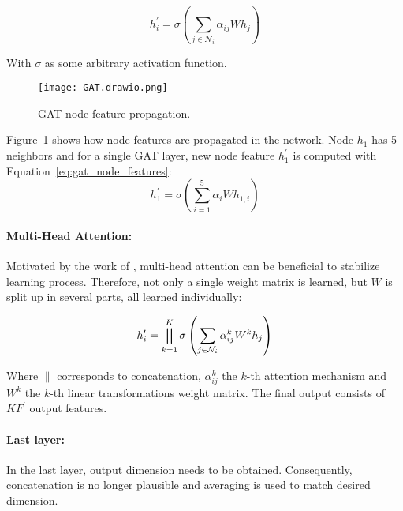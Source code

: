 \begin{equation}
  h_i^{\prime} = \sigma \left( \sum_{j \in \mathcal{N}_i} \alpha_{ij} W h_j \right)
  \label{eq:gat_node_features}
\end{equation}

With $\sigma$ as some arbitrary activation function.

\begin{minipage}{0.25\textwidth}
  \begin{figure}[H]
    \texttt{[image: GAT.drawio.png]}
    \caption{GAT node feature propagation.}
    \label{fig:gat_attention_illustration}
  \end{figure}
  \end{minipage} \hfill
  \begin{minipage}{0.7\textwidth}
    Figure~\ref{fig:gat_attention_illustration} shows how node features are propagated
    in the network.
    Node $h_1$ has 5 neighbors and for a single GAT layer, new node feature $h_1^{\prime}$
    is computed with Equation~\ref{eq:gat_node_features}: 
    $$h_{1}^{\prime} = \sigma \left( \sum_{i=1}^5\alpha_iWh_{1,i} \right)$$

  \end{minipage}


\paragraph{Multi-Head Attention:}
Motivated by the work of \citet{transformer}, multi-head attention can be beneficial to stabilize learning process.
Therefore, not only a single weight matrix is learned, but $W$ is split up in several parts, 
all learned individually:

\begin{equation}
  h_i^{\prime} = \bigparallel^K_{k=1} \sigma \left(\sum_{j \in \mathcal{N}_i} \alpha_{ij}^k W^k h_j \right)  
\end{equation}

Where $\parallel$ corresponds to concatenation, $\alpha_{ij}^k$ the $k$-th attention mechanism and $W^k$ the $k$-th linear
transformations weight matrix. The final output consists of $KF^{\prime}$ output features.

\paragraph{Last layer:}
In the last layer, output dimension needs to be obtained. 
Consequently, concatenation is no longer plausible and averaging is used to match desired dimension.

